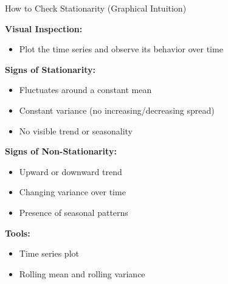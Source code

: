 \documentclass[aspectratio=169]{beamer}
\begin{document}
\begin{frame}{How to Check Stationarity (Graphical Intuition)}

\textbf{Visual Inspection:}
\begin{itemize}
    \item Plot the time series and observe its behavior over time
\end{itemize}

\vspace{0.4cm}

\textbf{Signs of Stationarity:}
\begin{itemize}
    \item Fluctuates around a constant mean
    \item Constant variance (no increasing/decreasing spread)
    \item No visible trend or seasonality
\end{itemize}

\vspace{0.4cm}

\textbf{Signs of Non-Stationarity:}
\begin{itemize}
    \item Upward or downward trend
    \item Changing variance over time
    \item Presence of seasonal patterns
\end{itemize}

\vspace{0.4cm}

\textbf{Tools:}
\begin{itemize}
    \item Time series plot
    \item Rolling mean and rolling variance
\end{itemize}

\end{frame}
\end{document}
